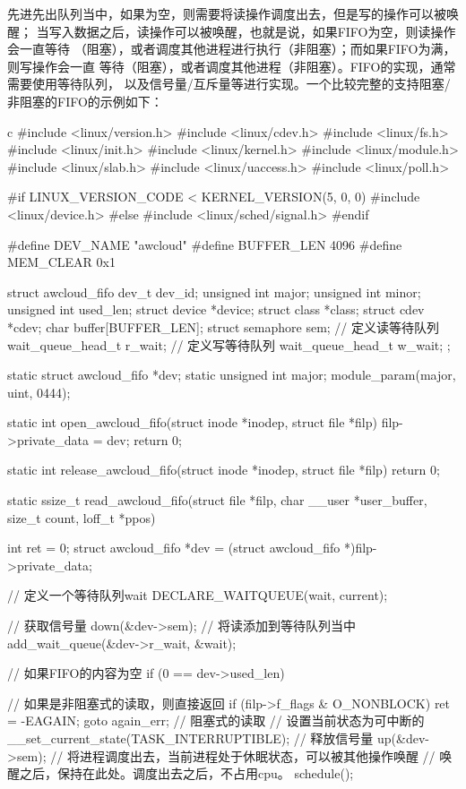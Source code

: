 先进先出队列当中，如果为空，则需要将读操作调度出去，但是写的操作可以被唤醒；
当写入数据之后，读操作可以被唤醒，也就是说，如果FIFO为空，则读操作会一直等待
（阻塞），或者调度其他进程进行执行（非阻塞）；而如果FIFO为满，则写操作会一直
等待（阻塞），或者调度其他进程（非阻塞）。FIFO的实现，通常需要使用等待队列，
以及信号量/互斥量等进行实现。一个比较完整的支持阻塞/非阻塞的FIFO的示例如下：
\begin{code-block}{c}
#include <linux/version.h>
#include <linux/cdev.h>
#include <linux/fs.h>
#include <linux/init.h>
#include <linux/kernel.h>
#include <linux/module.h>
#include <linux/slab.h>
#include <linux/uaccess.h>
#include <linux/poll.h>

#if LINUX_VERSION_CODE < KERNEL_VERSION(5, 0, 0)
#include <linux/device.h>
#else
#include <linux/sched/signal.h>
#endif

#define DEV_NAME "awcloud"
#define BUFFER_LEN 4096
#define MEM_CLEAR 0x1

struct awcloud_fifo {
        dev_t             dev_id;
        unsigned int      major;
        unsigned int      minor;
        unsigned int      used_len;
        struct device     *device;
        struct class      *class;
        struct cdev       *cdev;
        char              buffer[BUFFER_LEN];
        struct semaphore  sem;
        // 定义读等待队列
        wait_queue_head_t r_wait;
        // 定义写等待队列
        wait_queue_head_t w_wait;
};

static struct awcloud_fifo *dev;
static unsigned int major;
module_param(major, uint, 0444);

static int open_awcloud_fifo(struct inode *inodep, struct file *filp)
{
        filp->private_data = dev;
        return 0;
}

static int release_awcloud_fifo(struct inode *inodep, struct file *filp)
{
        return 0;
}

static ssize_t read_awcloud_fifo(struct file *filp,
        char __user *user_buffer, size_t count, loff_t *ppos)
{
        int ret = 0;
        struct awcloud_fifo *dev = (struct awcloud_fifo *)filp->private_data;

        // 定义一个等待队列wait
        DECLARE_WAITQUEUE(wait, current);

        // 获取信号量
        down(&dev->sem);
        // 将读添加到等待队列当中
        add_wait_queue(&dev->r_wait, &wait);

        // 如果FIFO的内容为空
        if (0 == dev->used_len) {
                // 如果是非阻塞式的读取，则直接返回
                if (filp->f_flags & O_NONBLOCK) {
                        ret = -EAGAIN;
                        goto again_err;
                }
                // 阻塞式的读取
                // 设置当前状态为可中断的
                __set_current_state(TASK_INTERRUPTIBLE);
                // 释放信号量
                up(&dev->sem);
                // 将进程调度出去，当前进程处于休眠状态，可以被其他操作唤醒
                // 唤醒之后，保持在此处。调度出去之后，不占用cpu。
                schedule();

}}
\end{code-block}
